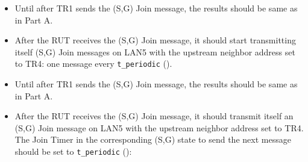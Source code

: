 \documentclass[11pt]{report}
\begin{document}
\begin{itemize}

  \item Until after TR1 sends the (S,G) Join message, the results should be
  same as in Part A.

  \item After the RUT receives the (S,G) Join message, it should start
  transmitting itself (S,G) Join messages on LAN5 with the upstream
  neighbor address set to TR4: one message every \verb=t_periodic=
  ({\PimsmTPeriodic}).

\end{itemize}


\begin{itemize}

  \item Until after TR1 sends the (S,G) Join message, the results should be
  same as in Part A.

  \item After the RUT receives the (S,G) Join message, it should
  transmit itself an (S,G) Join message on LAN5 with the upstream
  neighbor address set to TR4. The Join Timer in the corresponding (S,G)
  state to send the next message should be set to \verb=t_periodic=
  ({\PimsmTPeriodic}):


\end{itemize}
\end{document}
